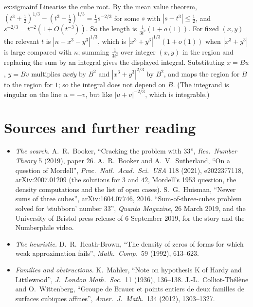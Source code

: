 \begin{solution}{ex:sigmainf}
\idea Linearise the cube root.
\writeup By the mean value theorem, $(t^3+\frac12)^{1/3}-(t^3-\frac12)^{1/3}=\frac13s^{-2/3}$ for some $s$ with $|s-t^3|\le\frac12$, and $s^{-2/3}=t^{-2}(1+O(t^{-3}))$. So the length is $\frac1{3t^2}(1+o(1))$. For fixed $(x,y)$ the
relevant $t$ is $|n-x^3-y^3|^{1/3}$, which is $|x^3+y^3|^{1/3}(1+o(1))$ when $|x^3+y^3|$ is large compared with $n$; summing $\frac1{3t^2}$ over integer $(x,y)$ in the region and replacing the sum by an integral gives the
displayed integral. Substituting $x=Bu$, $y=Bv$ multiplies $\dd x\dd y$ by $B^2$ and $|x^3+y^3|^{2/3}$ by $B^2$, and maps the region for $B$ to the region for $1$; so the integral does not depend on $B$. (The integrand
is singular on the line $u=-v$, but like $|u+v|^{-2/3}$, which is integrable.)
\end{solution}

\section*{Sources and further reading}

\begin{itemize}
\item \emph{The search.} A.~R.~Booker, ``Cracking the problem with 33'', \emph{Res.\ Number Theory} 5 (2019), paper 26. A.~R.~Booker and A.~V.~Sutherland, ``On a question of Mordell'',
\emph{Proc.\ Natl.\ Acad.\ Sci.\ USA} 118 (2021), e2022377118, arXiv:2007.01209 (the solutions for $3$ and $42$, Mordell's 1953 question, the density computations and the list of open cases).
S.~G.~Huisman, ``Newer sums of three cubes'', arXiv:1604.07746, 2016. ``Sum-of-three-cubes problem solved for `stubborn' number 33'', \emph{Quanta Magazine}, 26 March 2019, and the University of Bristol
press release of 6 September 2019, for the story and the Numberphile video.
\item \emph{The heuristic.} D.~R.~Heath-Brown, ``The density of zeros of forms for which weak approximation fails'', \emph{Math.\ Comp.}\ 59 (1992), 613--623.
\item \emph{Families and obstructions.} K.~Mahler, ``Note on hypothesis K of Hardy and Littlewood'', \emph{J.\ London Math.\ Soc.}\ 11 (1936), 136--138. J.-L.~Colliot-Th\'el\`ene and O.~Wittenberg,
``Groupe de Brauer et points entiers de deux familles de surfaces cubiques affines'', \emph{Amer.\ J.\ Math.}\ 134 (2012), 1303--1327.
\end{itemize}
